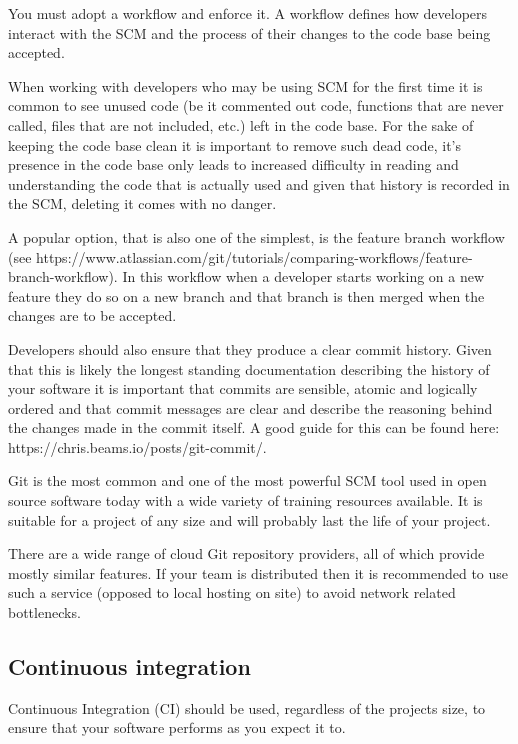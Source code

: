 \documentclass[jnr]{iosart2x}
\begin{document}
You must adopt a workflow and enforce it.
A workflow defines how developers interact with the SCM and the process of their changes to the code base being accepted.

When working with developers who may be using SCM for the first time it is common to see unused code (be it commented out code, functions that are never called, files that are not included, etc.) left in the code base.
For the sake of keeping the code base clean it is important to remove such dead code, it's presence in the code base only leads to increased difficulty in reading and understanding the code that is actually used and given that history is recorded in the SCM, deleting it comes with no danger.

A popular option, that is also one of the simplest, is the feature branch workflow (see https://www.atlassian.com/git/tutorials/comparing-workflows/feature-branch-workflow).
In this workflow when a developer starts working on a new feature they do so on a new branch and that branch is then merged when the changes are to be accepted.

Developers should also ensure that they produce a clear commit history.
Given that this is likely the longest standing documentation describing the history of your software it is important that commits are sensible, atomic and logically ordered and that commit messages are clear and describe the reasoning behind the changes made in the commit itself.
A good guide for this can be found here: https://chris.beams.io/posts/git-commit/.

Git is the most common and one of the most powerful SCM tool used in open source software today with a wide variety of training resources available.
It is suitable for a project of any size and will probably last the life of your project.

There are a wide range of cloud Git repository providers, all of which provide mostly similar features.
If your team is distributed then it is recommended to use such a service (opposed to local hosting on site) to avoid network related bottlenecks.

\subsection{Continuous integration}
\label{Continuous integration}

Continuous Integration (CI) should be used, regardless of the projects size, to ensure that your software performs as you expect it to.
\end{document}
